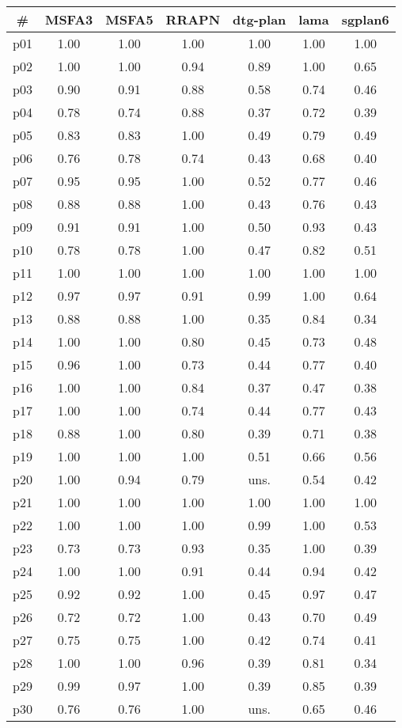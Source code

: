 \begin{tabular}{ccccccc}
\toprule
\textbf{\#} & \textbf{MSFA3} & \textbf{MSFA5} & \textbf{RRAPN} & \textbf{dtg-plan} & \textbf{lama} & \textbf{sgplan6}\\
\midrule
p01 & 1.00 & 1.00 & 1.00 & 1.00 & 1.00 & 1.00\\
p02 & 1.00 & 1.00 & 0.94 & 0.89 & 1.00 & 0.65\\
p03 & 0.90 & 0.91 & 0.88 & 0.58 & 0.74 & 0.46\\
p04 & 0.78 & 0.74 & 0.88 & 0.37 & 0.72 & 0.39\\
p05 & 0.83 & 0.83 & 1.00 & 0.49 & 0.79 & 0.49\\
p06 & 0.76 & 0.78 & 0.74 & 0.43 & 0.68 & 0.40\\
p07 & 0.95 & 0.95 & 1.00 & 0.52 & 0.77 & 0.46\\
p08 & 0.88 & 0.88 & 1.00 & 0.43 & 0.76 & 0.43\\
p09 & 0.91 & 0.91 & 1.00 & 0.50 & 0.93 & 0.43\\
p10 & 0.78 & 0.78 & 1.00 & 0.47 & 0.82 & 0.51\\
p11 & 1.00 & 1.00 & 1.00 & 1.00 & 1.00 & 1.00\\
p12 & 0.97 & 0.97 & 0.91 & 0.99 & 1.00 & 0.64\\
p13 & 0.88 & 0.88 & 1.00 & 0.35 & 0.84 & 0.34\\
p14 & 1.00 & 1.00 & 0.80 & 0.45 & 0.73 & 0.48\\
p15 & 0.96 & 1.00 & 0.73 & 0.44 & 0.77 & 0.40\\
p16 & 1.00 & 1.00 & 0.84 & 0.37 & 0.47 & 0.38\\
p17 & 1.00 & 1.00 & 0.74 & 0.44 & 0.77 & 0.43\\
p18 & 0.88 & 1.00 & 0.80 & 0.39 & 0.71 & 0.38\\
p19 & 1.00 & 1.00 & 1.00 & 0.51 & 0.66 & 0.56\\
p20 & 1.00 & 0.94 & 0.79 & uns. & 0.54 & 0.42\\
p21 & 1.00 & 1.00 & 1.00 & 1.00 & 1.00 & 1.00\\
p22 & 1.00 & 1.00 & 1.00 & 0.99 & 1.00 & 0.53\\
p23 & 0.73 & 0.73 & 0.93 & 0.35 & 1.00 & 0.39\\
p24 & 1.00 & 1.00 & 0.91 & 0.44 & 0.94 & 0.42\\
p25 & 0.92 & 0.92 & 1.00 & 0.45 & 0.97 & 0.47\\
p26 & 0.72 & 0.72 & 1.00 & 0.43 & 0.70 & 0.49\\
p27 & 0.75 & 0.75 & 1.00 & 0.42 & 0.74 & 0.41\\
p28 & 1.00 & 1.00 & 0.96 & 0.39 & 0.81 & 0.34\\
p29 & 0.99 & 0.97 & 1.00 & 0.39 & 0.85 & 0.39\\
p30 & 0.76 & 0.76 & 1.00 & uns. & 0.65 & 0.46\\
\bottomrule
\end{tabular}

